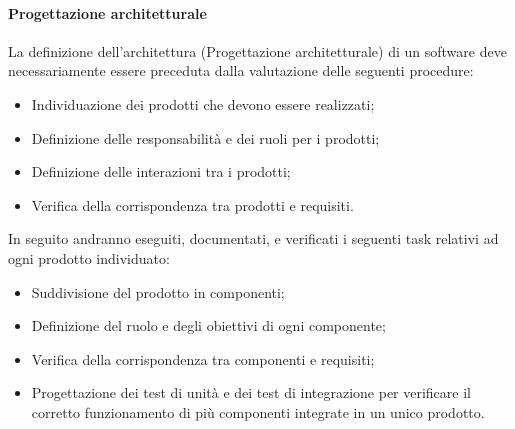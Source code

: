 			\paragraph*{Progettazione architetturale}
			La definizione dell'architettura (Progettazione architetturale) di un software deve 
			necessariamente essere preceduta dalla valutazione delle seguenti procedure:
                        \begin{itemize}
                                \item Individuazione dei prodotti che devono essere realizzati;
                                \item Definizione delle responsabilità e dei ruoli per i prodotti;
                                \item Definizione delle interazioni tra i prodotti;
                                \item Verifica della corrispondenza tra prodotti e requisiti.
                        \end{itemize}
                        In seguito andranno eseguiti, documentati, e verificati i seguenti task relativi ad ogni prodotto individuato:
                        \begin{itemize}
                                \item Suddivisione del prodotto in componenti;
                                \item Definizione del ruolo e degli obiettivi di ogni componente;
                                \item Verifica della corrispondenza tra componenti e requisiti;
                                \item Progettazione dei test di unità e dei test di integrazione per verificare il corretto funzionamento di
                                      più componenti integrate in un unico prodotto.
                        \end{itemize}
			
